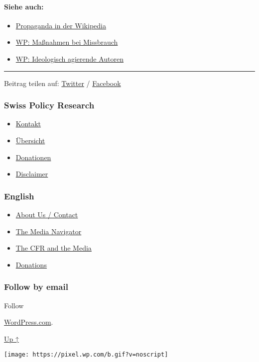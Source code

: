 \hypertarget{siehe-auch}{%
\paragraph{Siehe auch:}\label{siehe-auch}}

\begin{itemize}
\tightlist
\item
  \href{https://swprs.org/propaganda-in-der-wikipedia/}{Propaganda in
  der Wikipedia}
\item
  \href{https://swprs.org/wikipedia-missbrauch-massnahmen/}{WP:
  Maßnahmen bei Missbrauch}
\item
  \href{https://swprs.org/wikipedia-manipulation-autoren/}{WP:
  Ideologisch agierende Autoren}
\end{itemize}

\begin{center}\rule{0.5\linewidth}{\linethickness}\end{center}

Beitrag teilen auf:
\href{https://twitter.com/intent/tweet?url=https://swprs.org/weiteres-urteil-im-fall-wikipedia/}{Twitter}
/
\href{https://www.facebook.com/share.php?u=https://swprs.org/weiteres-urteil-im-fall-wikipedia/}{Facebook}

\hypertarget{swiss-policy-research}{%
\subsubsection{Swiss Policy Research}\label{swiss-policy-research}}

\begin{itemize}
\tightlist
\item
  \href{https://swprs.org/kontakt/}{Kontakt}
\item
  \href{https://swprs.org/uebersicht/}{Übersicht}
\item
  \href{https://swprs.org/donationen/}{Donationen}
\item
  \href{https://swprs.org/disclaimer/}{Disclaimer}
\end{itemize}

\hypertarget{english}{%
\subsubsection{English}\label{english}}

\begin{itemize}
\tightlist
\item
  \href{https://swprs.org/contact/}{About Us / Contact}
\item
  \href{https://swprs.org/media-navigator/}{The Media Navigator}
\item
  \href{https://swprs.org/the-american-empire-and-its-media/}{The CFR
  and the Media}
\item
  \href{https://swprs.org/donations/}{Donations}
\end{itemize}

\hypertarget{follow-by-email}{%
\subsubsection{Follow by email}\label{follow-by-email}}

Follow

\href{https://wordpress.com/?ref=footer_custom_com}{WordPress.com}.

\protect\hyperlink{}{Up ↑}

\texttt{[image: https://pixel.wp.com/b.gif?v=noscript]}
